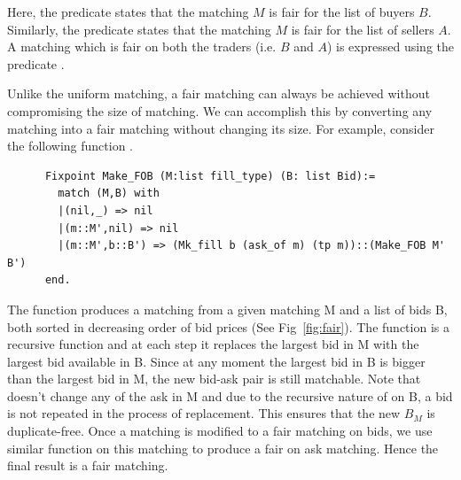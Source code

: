 \documentclass[a4paper,UKenglish,cleveref, autoref]{lipics-v2019}
\begin{document}
\begin{definition}
 \end{definition}
\begin{definition}
\end{definition}
\begin{definition}
\end{definition}

Here, the predicate   states that the matching $M$  is fair for the list of buyers $B$. Similarly,  the predicate  states that the matching $M$  is fair for the list of sellers $A$.  A matching which is fair on both the traders (i.e. $B$ and $A$) is expressed using the predicate .

Unlike the uniform matching, a fair matching can always be achieved without compromising the size of matching. We can accomplish this by converting any matching into a fair matching without changing its size. For example, consider the following function .

\begin{verbatim}
	  Fixpoint Make_FOB (M:list fill_type) (B: list Bid):=
	    match (M,B) with 
	    |(nil,_) => nil
	    |(m::M',nil) => nil
	    |(m::M',b::B') => (Mk_fill b (ask_of m) (tp m))::(Make_FOB M' B')
	  end.
\end{verbatim}

The function  produces a  matching from a given matching M and a list of bids B, both sorted in decreasing order of bid prices (See Fig~\ref{fig:fair}). The function  is a recursive function and  at each step it replaces the largest bid in M with the largest bid available in B. Since at any moment the largest bid in B is bigger than the largest bid in M, the new bid-ask pair is still matchable. Note that  doesn't change any of the ask in M and due to the recursive nature of  on B, a bid is not repeated in the process of replacement.  This ensures that the new $B_M$ is duplicate-free. Once a matching is modified to a fair matching on bids, we use similar function  on this matching to produce a fair on ask matching. Hence the final result is a fair matching. 
\end{document}
